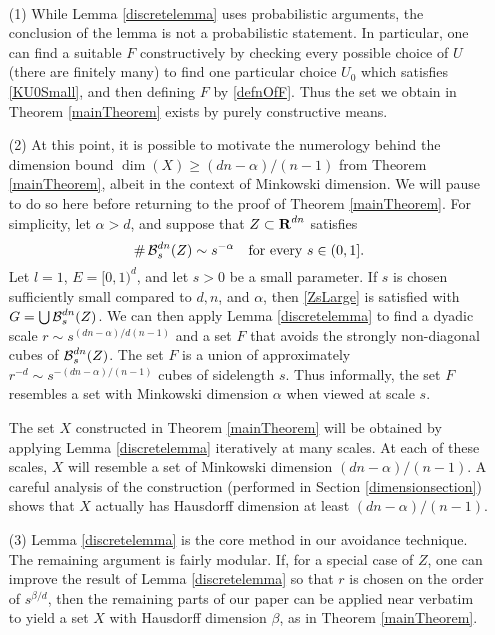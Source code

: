\begin{remarks}
	\
	\begin{enumerate}
		\item[(1)] While Lemma \ref{discretelemma} uses probabilistic arguments, the conclusion of the lemma is not a probabilistic statement. In particular, one can find a suitable $F$ constructively by checking every possible choice of $U$ (there are finitely many) to find one particular choice $U_0$ which satisfies \eqref{KU0Small}, and then defining $F$ by \eqref{defnOfF}. Thus the set we obtain in Theorem \ref{mainTheorem} exists by purely constructive means.
		
		\item[(2)] At this point, it is possible to motivate the numerology behind the dimension bound $\dim(X) \geq (dn-\alpha)/(n-1)$ from Theorem \ref{mainTheorem}, albeit in the context of Minkowski dimension. We will pause to do so here before returning to the proof of Theorem \ref{mainTheorem}. For simplicity, let $\alpha > d$, and suppose that $Z \subset \operatorname{\mathbf{R}}^{dn}$ satisfies 
		\begin{equation}\label{specialCase}
			\#\B_{s}^{dn}(Z) \sim s^{-\alpha} \quad \textrm{for every}\ s \in (0,1].
		\end{equation}
		Let $l = 1$, $E = [0,1)^d$, and let $s > 0$ be a small parameter. If $s$ is chosen sufficiently small compared to $d,n$, and $\alpha$, then \eqref{ZsLarge} is satisfied with $G = \bigcup \operatorname{\mathcal{B}}^{dn}_s(Z)$. We can then apply Lemma \ref{discretelemma} to find a dyadic scale $r \sim s^{(dn-\alpha)/d(n-1)}$ and a set $F$ that avoids the strongly non-diagonal cubes of $\operatorname{\mathcal{B}}_{s}^{dn}(Z)$. The set $F$ is a union of approximately $r^{-d} \sim s^{-(dn-\alpha)/(n-1)}$ cubes of sidelength $s$. Thus informally, the set $F$ resembles a set with Minkowski dimension $\alpha$ when viewed at scale $s$. 

		The set $X$ constructed in Theorem \ref{mainTheorem} will be obtained by applying Lemma \ref{discretelemma} iteratively at many scales. At each of these scales, $X$ will resemble a set of Minkowski dimension $(dn - \alpha)/(n-1)$. A careful analysis of the construction (performed in Section \ref{dimensionsection}) shows that $X$ actually has Hausdorff dimension at least $(dn - \alpha)/(n-1)$.

		\item[(3)] Lemma \ref{discretelemma} is the core method in our avoidance technique. The remaining argument is fairly modular. If, for a special case of $Z$, one can improve the result of Lemma \ref{discretelemma} so that $r$ is chosen on the order of $s^{\beta/d}$, then the remaining parts of our paper can be applied near verbatim to yield a set $X$ with Hausdorff dimension $\beta$, as in Theorem \ref{mainTheorem}. 
	\end{enumerate} 
\end{remarks}









